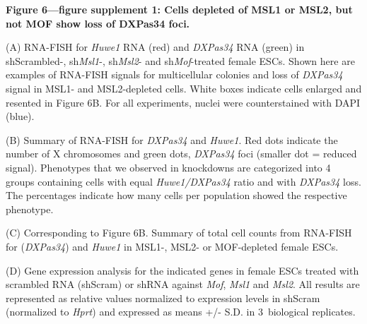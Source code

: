 \begin{footnotesize}
\begin{sffamily}
\begin{singlespacing}
\textbf{Figure 6—figure supplement 1: Cells depleted of MSL1 or MSL2, but not MOF show loss of DXPas34 foci.}

(A) RNA-FISH for \textit{Huwe1} RNA (red) and \textit{DXPas34} RNA (green) in shScrambled-, sh\textit{Msl1}-, sh\textit{Msl2}- and sh\textit{Mof}-treated female ESCs. Shown here are examples of RNA-FISH signals for multicellular colonies and loss of \textit{DXPas34} signal in MSL1- and MSL2-depleted cells. White boxes indicate cells enlarged and resented in Figure 6B. For all experiments, nuclei were coun\-ter\-stained with DAPI (blue).

(B) Summary of RNA-FISH for \textit{DXPas34} and \textit{Huwe1}. Red dots indicate the number of X chromosomes and green dots, \textit{DXPas34} foci (smaller dot = reduced signal). Phenotypes that we observed in knockdowns are categorized into 4 groups containing cells with equal \textit{Huwe1/DXPas34} ratio and with \textit{DXPas34} loss. The percentages indicate how many cells per population showed the respective phenotype.

(C) Corresponding to Figure 6B. Summary of total cell counts from RNA-FISH for (\textit{DXPas34}) and \textit{Huwe1} in MSL1-, MSL2- or MOF-depleted female ESCs.

(D) Gene expression analysis for the indicated genes in female ESCs treated with scrambled RNA (shScram) or shRNA against \textit{Mof}, \textit{Msl1} and \textit{Msl2}. All results are represented as relative values normalized to expression levels in shScram (normalized to \textit{Hprt}) and expressed as means +/- S.D. in 3~biological replicates.


\end{singlespacing}
\end{sffamily}
\end{footnotesize}
